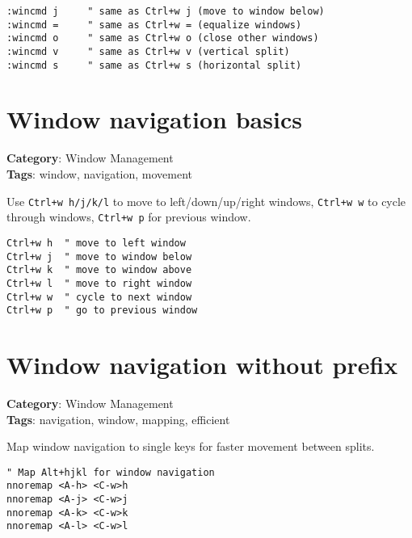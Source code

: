 {{{{{{{{{{{{{{{{{{{\begin{Exa*}{}
\begin{Verbatim}[fontsize=\footnotesize, breaklines, breakanywhere]
:wincmd j     " same as Ctrl+w j (move to window below)
:wincmd =     " same as Ctrl+w = (equalize windows)
:wincmd o     " same as Ctrl+w o (close other windows)
:wincmd v     " same as Ctrl+w v (vertical split)
:wincmd s     " same as Ctrl+w s (horizontal split)
\end{Verbatim}
\end{Exa*}

\section{Window navigation basics}

\textbf{Category}: Window Management\\ \textbf{Tags}: window, navigation, movement
\vspace{0.5cm}

Use {\footnotesize \Verb§Ctrl+w h/j/k/l§} to move to left/down/up/right windows, {\footnotesize \Verb§Ctrl+w w§} to cycle through windows, {\footnotesize \Verb§Ctrl+w p§} for previous window.

\begin{Exa*}{}
\begin{Verbatim}[fontsize=\footnotesize, breaklines, breakanywhere]
Ctrl+w h  " move to left window
Ctrl+w j  " move to window below
Ctrl+w k  " move to window above
Ctrl+w l  " move to right window
Ctrl+w w  " cycle to next window
Ctrl+w p  " go to previous window
\end{Verbatim}
\end{Exa*}

\section{Window navigation without prefix}

\textbf{Category}: Window Management\\ \textbf{Tags}: navigation, window, mapping, efficient
\vspace{0.5cm}

Map window navigation to single keys for faster movement between splits.

\begin{Exa*}{}
\begin{Verbatim}[fontsize=\footnotesize, breaklines, breakanywhere]
" Map Alt+hjkl for window navigation
nnoremap <A-h> <C-w>h
nnoremap <A-j> <C-w>j
nnoremap <A-k> <C-w>k
nnoremap <A-l> <C-w>l


\end{Verbatim}
\end{Exa*}}}}}}}}}}}}}}}}}}}}
